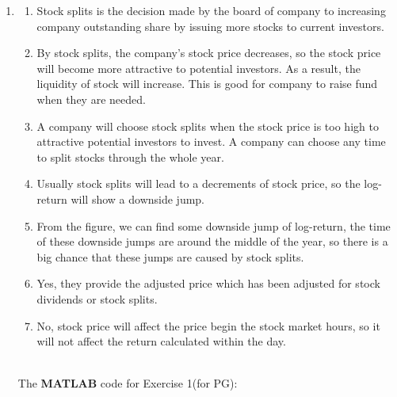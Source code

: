 \documentclass[12pt,letterpaper]{article}
\begin{document}
\begin{enumerate}[label=\textbf{(\Alph*)}]
\item 
 \begin{enumerate}[label=(\roman*)]
  \item Stock splits is the decision made by the board of company to increasing company outstanding share by issuing more stocks to current investors.
  \item By stock splits, the company's stock price decreases, so the stock price will become more attractive to potential investors. As a result, the liquidity of stock will increase. This is good for company to raise fund when they are needed.
  \item A company will choose stock splits when the stock price is too high to attractive potential investors to invest. A company can choose any time to split stocks through the whole year.
  \item Usually stock splits will lead to a decrements of stock price, so the log-return will show a downside jump.
  \item From the figure, we can find some downside jump of log-return, the time of these downside jumps are around the middle of the year, so there is a big chance that these jumps are caused by stock splits.
  \item Yes, they provide the adjusted price which has been adjusted for stock dividends or stock splits.
  \item No, stock price will affect the price begin the stock market hours, so it will not affect the return calculated within the day.\\
  \\
  
\end{enumerate}
The \textbf{MATLAB} code for Exercise 1(for PG):
   

\end{enumerate}
\newpage

\end{document}
